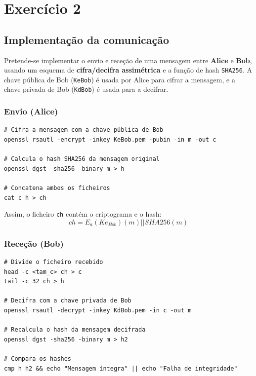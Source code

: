 % 
%  
%
\chapter{Exercício 2}
\label{cha:exercise_2}

\section{Implementação da comunicação}

Pretende-se implementar o envio e receção de uma mensagem entre \textbf{Alice} e \textbf{Bob}, usando um
esquema de \textbf{cifra/decifra assimétrica} e a função de hash \texttt{SHA256}.
A chave pública de Bob (\texttt{KeBob}) é usada por Alice para cifrar a mensagem, e a chave privada de Bob (\texttt{KdBob}) é usada para a decifrar.

\subsection*{Envio (Alice)}

\begin{verbatim}
# Cifra a mensagem com a chave pública de Bob
openssl rsautl -encrypt -inkey KeBob.pem -pubin -in m -out c

# Calcula o hash SHA256 da mensagem original
openssl dgst -sha256 -binary m > h

# Concatena ambos os ficheiros
cat c h > ch
\end{verbatim}

Assim, o ficheiro \texttt{ch} contém o criptograma e o hash:
\[
ch = E_a(Ke_{Bob})(m) || SHA256(m)
\]

\subsection*{Receção (Bob)}

\begin{verbatim}
# Divide o ficheiro recebido
head -c <tam_c> ch > c
tail -c 32 ch > h

# Decifra com a chave privada de Bob
openssl rsautl -decrypt -inkey KdBob.pem -in c -out m

# Recalcula o hash da mensagem decifrada
openssl dgst -sha256 -binary m > h2

# Compara os hashes
cmp h h2 && echo "Mensagem íntegra" || echo "Falha de integridade"
\end{verbatim} 

